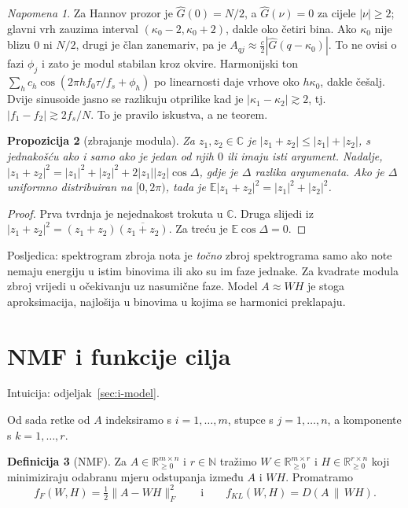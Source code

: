 \documentclass[11pt,a4paper]{article}
\theoremstyle{definition}
\newtheorem{definicija}{Definicija}[section]
\theoremstyle{plain}
\newtheorem{propozicija}[definicija]{Propozicija}
\theoremstyle{remark}
\newtheorem{napomena}[definicija]{Napomena}
\newcommand{\Rp}{\mathbb{R}_{\geq 0}}
\newcommand{\Dkl}[2]{D(#1\,\|\,#2)}
\newcommand{\intuicija}[1]{{\small\color{muted}\sffamily Intuicija: odjeljak~\ref{#1}.}\par}
\begin{document}
\begin{napomena}
Za Hannov prozor je $\hat G(0)=N/2$, a $\hat G(\nu)=0$ za cijele $|\nu|\geq2$; glavni vrh zauzima
interval $(\kappa_0-2,\kappa_0+2)$, dakle oko četiri bina. Ako $\kappa_0$ nije blizu $0$ ni $N/2$,
drugi je član zanemariv, pa je $A_{qj}\approx\frac c2|\hat G(q-\kappa_0)|$. To ne ovisi o fazi
$\phi_j$ i zato je modul stabilan kroz okvire. Harmonijski ton
$\sum_h c_h\cos(2\pi hf_0\tau/f_s+\phi_h)$ po linearnosti daje vrhove oko $h\kappa_0$, dakle češalj.
Dvije sinusoide jasno se razlikuju otprilike kad je $|\kappa_1-\kappa_2|\gtrsim2$, tj.\
$|f_1-f_2|\gtrsim2f_s/N$. To je pravilo iskustva, a ne teorem.
\end{napomena}

\begin{propozicija}[zbrajanje modula]\label{prop:zbrajanje}
Za $z_1,z_2\in\mathbb{C}$ je $|z_1+z_2|\leq|z_1|+|z_2|$, s jednakošću ako i samo ako je jedan od njih
$0$ ili imaju isti argument. Nadalje,
$|z_1+z_2|^2=|z_1|^2+|z_2|^2+2|z_1||z_2|\cos\Delta$, gdje je $\Delta$ razlika argumenata. Ako je
$\Delta$ uniformno distribuiran na $[0,2\pi)$, tada je $\mathbb{E}|z_1+z_2|^2=|z_1|^2+|z_2|^2$.
\end{propozicija}
\begin{proof}
Prva tvrdnja je nejednakost trokuta u $\mathbb{C}$. Druga slijedi iz
$|z_1+z_2|^2=(z_1+z_2)\overline{(z_1+z_2)}$. Za treću je $\mathbb{E}\cos\Delta=0$.
\end{proof}

Posljedica: spektrogram zbroja nota je \emph{točno} zbroj spektrograma samo ako note nemaju energiju
u istim binovima ili ako su im faze jednake. Za kvadrate modula zbroj vrijedi u očekivanju uz
nasumične faze. Model $A\approx WH$ je stoga aproksimacija, najlošija u binovima u kojima se
harmonici preklapaju.

\section{NMF i funkcije cilja}\label{sec:f-nmf}
\intuicija{sec:i-model}

Od sada retke od $A$ indeksiramo s $i=1,\dots,m$, stupce s $j=1,\dots,n$, a komponente s
$k=1,\dots,r$.

\begin{definicija}[NMF]
Za $A\in\Rp^{m\times n}$ i $r\in\mathbb{N}$ tražimo $W\in\Rp^{m\times r}$ i $H\in\Rp^{r\times n}$
koji minimiziraju odabranu mjeru odstupanja između $A$ i $WH$. Promatramo
\[
  f_F(W,H)=\tfrac12\|A-WH\|_F^2\qquad\text{i}\qquad f_{KL}(W,H)=\Dkl{A}{WH}.
\]
\end{definicija}
\end{document}
